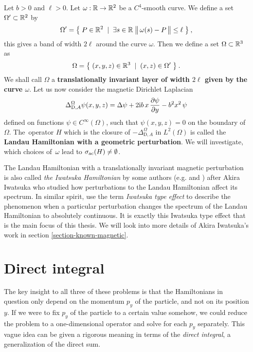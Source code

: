 \begin{defn}
    \label{defn-perturb-geom}
    Let $b>0$ and $\ell > 0$. Let $\omega: \mathbb{R} \to \mathbb{R}^2$ be a $C^4$-smooth curve. We define a set $\Omega' \subset \mathbb{R}^2$ by
    \begin{equation*}
        \Omega' = \big\{\;
            P \in \mathbb{R}^2
        \;\;|\;\;
            \exists s \in \mathbb{R} \;
            \big\lVert  \, \omega(s) - P \,  \big\rVert \leq \ell
        \;\big\}
        \: ,
    \end{equation*}
    this gives a band of width $2\ell$ around the curve $\omega$. \!Then we define a set $\Omega \subset \mathbb{R}^3$ as
    \begin{equation*}
        \Omega = \big\{\;
            (x, y, z) \in \mathbb{R}^3
        \;\;|\;\;
            (x, z) \in \Omega'
        \;\big\} \: .
    \end{equation*}
    We shall call $\Omega$ a \textbf{translationally invariant layer of width $2\ell$ given by the curve $\omega$}. Let us now consider the magnetic Dirichlet Laplacian
    \begin{align*}
        \Delta^\Omega_{\mathrm{D}, A} \psi(x,y,z)
        = \Delta \psi + 2\mathrm{i} b \, x \, \frac{\partial \psi}{\partial y} - b^2 x^2 \, \psi
    \end{align*}
    defined on functions $\psi \in C^\infty(\Omega)$, such that $\psi(x,y,z) = 0$ on the boundary of $\Omega$. The~operator $H$ which is the closure of $-\Delta^\Omega_{\mathrm{D}, A}$ in $L^2(\Omega)$ is called the \textbf{Landau Hamiltonian with a geometric perturbation}. We will investigate, which choices of~$\omega$ lead to $\sigma_{\mathrm{ac}}(H) \neq \emptyset$.
\end{defn}

The Landau Hamiltonian with a translationally invariant magnetic perturbation is also called \textit{the Iwatsuka Hamiltonian} by some authors (e.g. \cite{Miranda2017} and \cite{Hislop2015}) after Akira Iwatsuka who studied how perturbations to the Landau Hamiltonian affect its spectrum. In similar spirit, \cite{Exner2018} use the term \textit{Iwatsuka type effect} to describe the phenomenon when a particular perturbation changes the spectrum of the Landau Hamiltonian to absolutely continuous. It is exactly this Iwatsuka type effect that is the main focus of this thesis. We will look into more details of Akira Iwatsuka's work in section \ref{section-known-magnetic}.



\section{Direct integral}
The key insight to all three of these problems is that the Hamiltonians in question only depend on the momentum $p_y$ of the particle, and not on its position $y$. If we were to fix $p_y$ of the particle to a certain value somehow, we could reduce the problem to a one-dimensional operator and solve for each $p_y$ separately. This vague idea can be given a rigorous meaning in terms of the \textit{direct integral}, a generalization of the direct sum.

